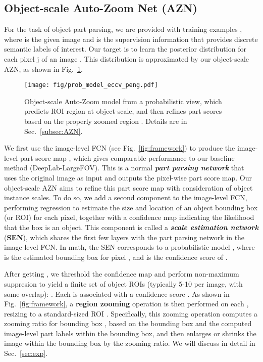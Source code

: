 \documentclass[runningheads]{llncs}
\begin{document}
\vspace{-0.7\baselineskip}
\subsection{Object-scale Auto-Zoom Net (AZN)}
\vspace{-0.4\baselineskip}
\label{subsec:AZN}
For the task of object part parsing, we are provided with  training examples , where  is the given image and  is the supervision information that provides discrete semantic labels of interest. Our target is to learn the posterior distribution  for each pixel j of an image . This distribution is approximated by our object-scale AZN, as shown in Fig.~\ref{fig:prob_model}.

\begin{figure}[!t]
\begin{center}
\texttt{[image: fig/prob\_model\_eccv\_peng.pdf]}
\end{center}
\vspace{-1\baselineskip}
 \caption{Object-scale Auto-Zoom model from a probabilistic view, which predicts ROI region  at object-scale, and then refines part scores based on the properly zoomed region . Details are in Sec.~\ref{subsec:AZN}.}
\vspace{-1.6\baselineskip}
\label{fig:prob_model}
\end{figure}

We first use the image-level FCN (see Fig.~\ref{fig:framework}) to produce the image-level part score map , which gives comparable performance to our baseline method (DeepLab-LargeFOV). This is a normal \emph{\textbf{part parsing network}} that uses the original image as input and outputs the pixel-wise part score map. Our object-scale AZN aims to refine this part score map with consideration of object instance scales. To do so, we add a second component to the image-level FCN, performing regression to estimate the size and location of an object bounding box (or ROI) for each pixel, together with a confidence map indicating the likelihood that the box is an object. This component is called a \emph{\textbf{scale estimation network}} (\textbf{SEN}), which shares the first few layers with the part parsing network in the image-level FCN. In math, the SEN corresponds to a probabilistic model , where  is the estimated bounding box for pixel , and  is the confidence score of .

After getting , we threshold the confidence map and perform non-maximum suppresion to yield a finite set of object ROIs (typically 5-10 per image, with some overlap): . Each  is associated with a confidence score . As shown in Fig.~\ref{fig:framework}, a \textbf{region zooming} operation is then performed on each , resizing  to a standard-sized ROI . Specifically, this zooming operation computes a zooming ratio  for bounding box , based on the bounding box  and the computed image-level part labels  within the bounding box, and then enlarges or shrinks the image within the bounding box by the zooming ratio. We will discuss  in detail in Sec.~\ref{sec:exp}.
\end{document}

